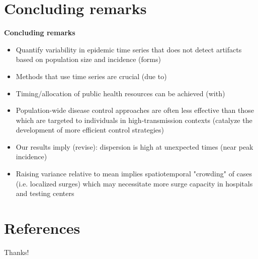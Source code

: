 \documentclass{beamer}
\begin{document}
\section{Concluding remarks}
\begin{frame}{\textbf{Concluding remarks}}
	\begin{itemize}[<+-| alert@+>]
		\item Quantify variability in epidemic time series that does not detect artifacts based on population size and incidence (forms)
		\item Methods that use time series are crucial  (due to) 
		\item Timing/allocation of public health resources can be achieved (with) 
		\item Population-wide disease control approaches are often less effective than those which are targeted to individuals in high-transmission contexts \cite{lloyd-smith_superspreading_2005} (catalyze the development of more efficient control strategies)
		\item Our results imply (revise): dispersion is high at unexpected times (near peak incidence)
		\item Raising variance relative to mean implies spatiotemporal "crowding" of cases (i.e. localized surges) which may necessitate more surge capacity in hospitals and testing centers
	\end{itemize}
\end{frame}

\section{References}

\begin{frame}
	\begin{center}
		{\Huge Thanks!}
	\end{center}
\end{frame}
\end{document}
